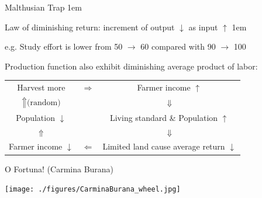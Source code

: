\documentclass[11pt,aspectratio=43,usenames,dvipsnames]{beamer}
\let\olditemize=\itemize
\let\endolditemize=\enditemize
\renewenvironment{itemize}{\olditemize \itemsep1em}{\endolditemize}
\theoremstyle{definition}
\begin{document}
\begin{frame}{Malthusian Trap}
\label{slide:Malthusian_Trap}
    \begin{itemize}
        \item Law of diminishing return: increment of output $ \downarrow  $ as input $ \uparrow $
        \begin{itemize}
            \item e.g. Study effort is lower from 50 $ \rightarrow  $ 60 compared with 90 $ \rightarrow  $ 100
        \end{itemize}
        \item Production function also exhibit \alert{diminishing average product of labor}:
    \end{itemize}

    \begin{center}
    \begin{tabular}{ c c c }
        Harvest more
            & $ \Rightarrow $
            & Farmer income $ \uparrow  $
        \\
        $ \Uparrow \text{(random)}  $
            &
            & $ \Downarrow $
        \\
        Population $ \downarrow  $
            &
            & Living standard \& Population $ \uparrow  $
        \\
        $ \Uparrow  $
            &
            & $ \Downarrow $
        \\
        Farmer income $ \downarrow  $
            & $ \Leftarrow  $
            & Limited land cause average return $ \downarrow  $
        \\
    \end{tabular}
    \end{center}

\end{frame}

\begin{frame}{O Fortuna! (Carmina Burana)}
\label{slide:O_Fortuna_}
    \begin{center}
        \texttt{[image: ./figures/CarminaBurana\_wheel.jpg]}
    \end{center}
\end{frame}
\end{document}
